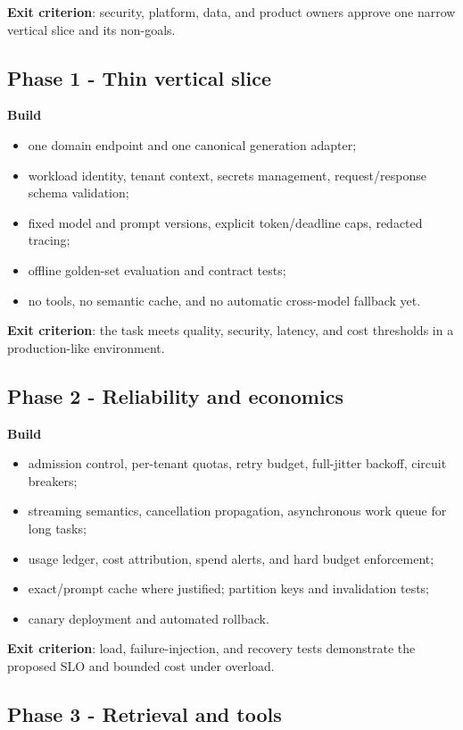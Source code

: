 \documentclass[10pt]{article}
\begin{document}
\textbf{Exit criterion}: security, platform, data, and product owners approve one narrow vertical slice and its non-goals.

\subsection{Phase 1 - Thin vertical slice}

\textbf{Build}
\begin{itemize}
  \item one domain endpoint and one canonical generation adapter;
  \item workload identity, tenant context, secrets management, request/response schema validation;
  \item fixed model and prompt versions, explicit token/deadline caps, redacted tracing;
  \item offline golden-set evaluation and contract tests;
  \item no tools, no semantic cache, and no automatic cross-model fallback yet.
\end{itemize}

\textbf{Exit criterion}: the task meets quality, security, latency, and cost thresholds in a production-like environment.

\subsection{Phase 2 - Reliability and economics}

\textbf{Build}
\begin{itemize}
  \item admission control, per-tenant quotas, retry budget, full-jitter backoff, circuit breakers;
  \item streaming semantics, cancellation propagation, asynchronous work queue for long tasks;
  \item usage ledger, cost attribution, spend alerts, and hard budget enforcement;
  \item exact/prompt cache where justified; partition keys and invalidation tests;
  \item canary deployment and automated rollback.
\end{itemize}

\textbf{Exit criterion}: load, failure-injection, and recovery tests demonstrate the proposed SLO and bounded cost under overload.

\subsection{Phase 3 - Retrieval and tools}
\end{document}
